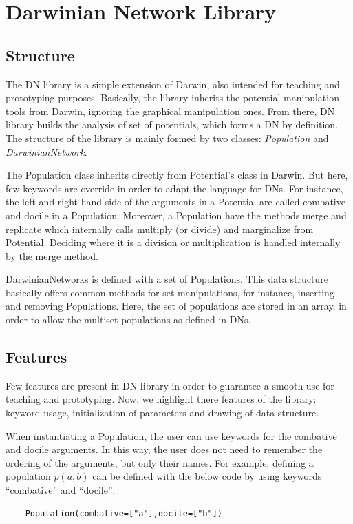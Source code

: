 \chapter{Darwinian Network Library}
\label{sec:dn_lib}

\section{Structure}
\label{sec:system:sec1}

The DN library is a simple extension of Darwin, also intended for teaching and prototyping purposes.
Basically, the library inherits the potential manipulation tools from Darwin, ignoring the graphical manipulation ones.
From there, DN library builds the analysis of set of potentials, which forms a DN by definition.
The structure of the library is mainly formed by two classes: \emph{Population} and \emph{DarwinianNetwork}.

The Population class inherits directly from Potential's class in Darwin.
But here, few keywords are override in order to adapt the language for DNs.
For instance, the left and right hand side of the arguments in a Potential are called combative and docile in a Population.
Moreover, a Population have the methods merge and replicate which internally calls multiply (or divide) and marginalize from Potential.
Deciding where it is a division or multiplication is handled internally by the merge method.

DarwinianNetworks is defined with a set of Populations.
This data structure basically offers common methods for set manipulations, for instance, inserting and removing Populations.
Here, the set of populations are stored in an array, in order to allow the multiset populations as defined in DNs.

\section{Features}
\label{sec:system:sec2}

Few features are present in DN library in order to guarantee a smooth use for teaching and prototyping.
Now, we highlight there features of the library: keyword usage, initialization of parameters and drawing of data structure.

When instantiating a Population, the user can use keywords for the combative and docile arguments.
In this way, the user does not need to remember the ordering of the arguments, but only their names.
For example, defining a population $p(a,b)$ can be defined with the below code by using keywords ``combative'' and ``docile'':
\begin{verbatim}
    Population(combative=["a"],docile=["b"])
\end{verbatim}

